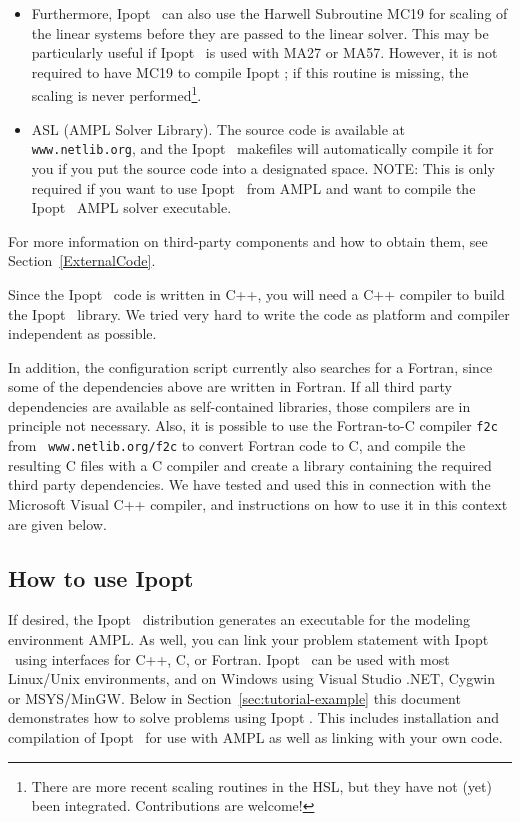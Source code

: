 \documentclass[10pt]{article}
\newcommand{\Ipopt}{{\sc Ipopt }}
\begin{document}
\begin{itemize}
\item Furthermore, \Ipopt\ can also use the Harwell Subroutine MC19
  for scaling of the linear systems before they are passed to the
  linear solver.  This may be particularly useful if \Ipopt\ is used
  with MA27 or MA57.  However, it is not required to have MC19 to
  compile \Ipopt; if this routine is missing, the scaling is never
  performed\footnote{There are more recent scaling routines in the
    HSL, but they have not (yet) been integrated.  Contributions are
    welcome!}.
\item ASL (AMPL Solver Library).  The source code is available at {\tt
    www.netlib.org}, and the \Ipopt\ makefiles will automatically
  compile it for you if you put the source code into a designated
  space.  NOTE: This is only required if you want to use \Ipopt\ from
  AMPL and want to compile the \Ipopt\ AMPL solver executable.
\end{itemize}
For more information on third-party components and how to obtain them,
see Section~\ref{ExternalCode}.

Since the \Ipopt\ code is written in C++, you will need a C++ compiler
to build the \Ipopt\ library.  We tried very hard to write the code as
platform and compiler independent as possible.

In addition, the configuration script currently also searches for a
Fortran, since some of the dependencies above are written in Fortran.
If all third party dependencies are available as self-contained
libraries, those compilers are in principle not necessary.  Also, it
is possible to use the Fortran-to-C compiler {\tt f2c} from {\tt
  www.netlib.org/f2c} to convert Fortran code to C, and compile the
resulting C files with a C compiler and create a library containing
the required third party dependencies.  We have tested and used this
in connection with the Microsoft Visual C++ compiler, and instructions
on how to use it in this context are given below.

\subsection{How to use \Ipopt}
If desired, the \Ipopt\ distribution generates an executable for the
modeling environment AMPL. As well, you can link your problem
statement with \Ipopt\ using interfaces for C++, C, or Fortran.
\Ipopt\ can be used with most Linux/Unix environments, and on Windows
using Visual Studio .NET, Cygwin or MSYS/MinGW.  Below in
Section~\ref{sec:tutorial-example} this document demonstrates how to
solve problems using \Ipopt. This includes installation and
compilation of \Ipopt\ for use with AMPL as well as linking with your
own code.
\end{document}
